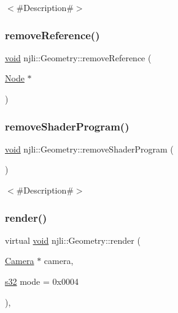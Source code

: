 $<$\#\+Description\#$>$ \mbox{\label{classnjli_1_1_geometry_a39b63002b1e195651b30186319f5cf6d}} 
\subsubsection{\texorpdfstring{remove\+Reference()}{removeReference()}}
{\footnotesize\ttfamily \mbox{\hyperlink{_thread_8h_af1e856da2e658414cb2456cb6f7ebc66}{void}} njli\+::\+Geometry\+::remove\+Reference (\begin{DoxyParamCaption}\item[{\mbox{\hyperlink{classnjli_1_1_node}{Node}} $\ast$}]{ }\end{DoxyParamCaption})\hspace{0.3cm}{\ttfamily [protected]}}

\mbox{\label{classnjli_1_1_geometry_aa4b0598066056bb2ffa97e85febadfa4}} 
\subsubsection{\texorpdfstring{remove\+Shader\+Program()}{removeShaderProgram()}}
{\footnotesize\ttfamily \mbox{\hyperlink{_thread_8h_af1e856da2e658414cb2456cb6f7ebc66}{void}} njli\+::\+Geometry\+::remove\+Shader\+Program (\begin{DoxyParamCaption}{ }\end{DoxyParamCaption})}

$<$\#\+Description\#$>$ \mbox{\label{classnjli_1_1_geometry_ab2f41460700ad44f8cea15d6e8b66fea}} 
\subsubsection{\texorpdfstring{render()}{render()}}
{\footnotesize\ttfamily virtual \mbox{\hyperlink{_thread_8h_af1e856da2e658414cb2456cb6f7ebc66}{void}} njli\+::\+Geometry\+::render (\begin{DoxyParamCaption}\item[{\mbox{\hyperlink{classnjli_1_1_camera}{Camera}} $\ast$}]{camera,  }\item[{\mbox{\hyperlink{_util_8h_aa62c75d314a0d1f37f79c4b73b2292e2}{s32}}}]{mode = {\ttfamily 0x0004} }\end{DoxyParamCaption})\hspace{0.3cm}{\ttfamily [protected]}, {\ttfamily [virtual]}}

